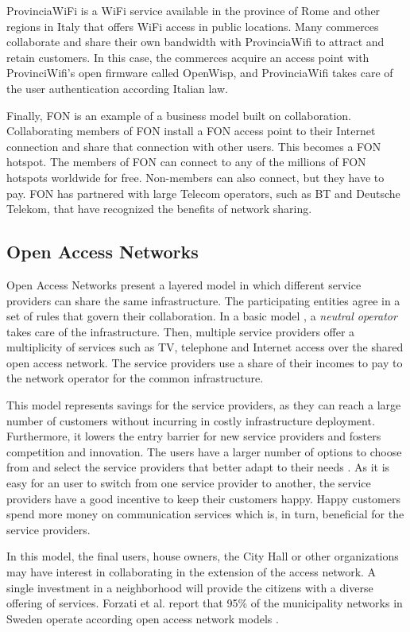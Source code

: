 \documentclass[journal]{IEEEtran}
\begin{document}
ProvinciaWiFi is a WiFi service available in the province of Rome and other regions in Italy that offers WiFi access in public locations.
Many commerces collaborate and share their own bandwidth with ProvinciaWifi to attract and retain customers.
In this case, the commerces acquire an access point with ProvinciWifi's open firmware called OpenWisp, and ProvinciaWifi takes care of the user authentication according Italian law.

Finally, FON is an example of a business model built on collaboration.
Collaborating members of FON install a FON access point to their Internet connection and share that connection with other users.
This becomes a FON hotspot.
The members of FON can connect to any of the millions of FON hotspots worldwide for free.
Non-members can also connect, but they have to pay.
FON has partnered with large Telecom operators, such as BT and Deutsche Telekom, that have recognized the benefits of network sharing.


\subsection{Open Access Networks}

Open Access Networks present a layered model in which different service providers can share the same infrastructure.
The participating entities agree in a set of rules that govern their collaboration.
In a basic model \cite{battiti2005wireless}, a \emph{neutral operator} takes care of the infrastructure.
Then, multiple service providers offer a multiplicity of services such as TV, telephone and Internet access over the shared open access network.
The service providers use a share of their incomes to pay to the network operator for the common infrastructure.

This model represents savings for the service providers, as they can reach a large number of customers without incurring in costly infrastructure deployment.
Furthermore, it lowers the entry barrier for new service providers and fosters competition and innovation.
The users have a larger number of options to choose from and select the service providers that better adapt to their needs \cite{domingo2011med}.
As it is easy for an user to switch from one service provider to another, the service providers have a good incentive to keep their customers happy.
Happy customers spend more money on communication services which is, in turn, beneficial for the service providers.

In this model, the final users, house owners, the City Hall or other organizations may have interest in collaborating in the extension of the access network.
A single investment in a neighborhood will provide the citizens with a diverse offering of services.
Forzati et al. report that 95\% of the municipality networks in Sweden operate according open access network models \cite{forzati2010open}.
\end{document}
